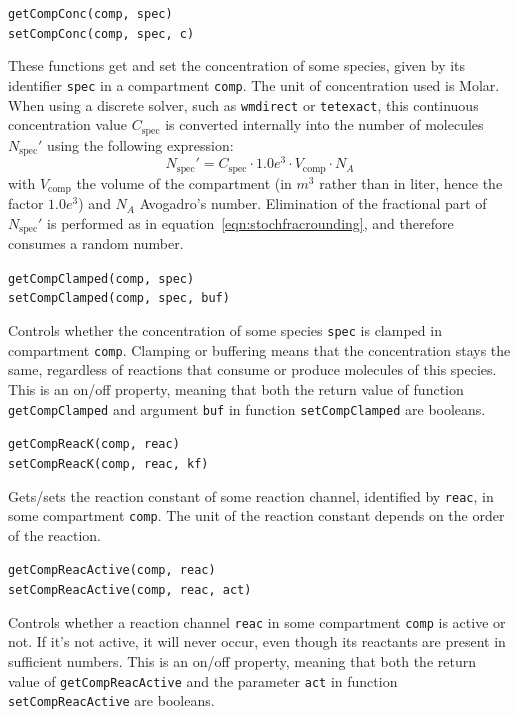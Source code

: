 \documentclass[a4paper,12pt]{book}
\begin{document}
{\texttt{getCompConc(comp, spec)}\\
\texttt{setCompConc(comp, spec, c)}

These functions get and set the concentration of some species, given by its identifier \texttt{spec} in a compartment \texttt{comp}. The unit of concentration used is Molar. When using a discrete solver, such as \texttt{wmdirect} or \texttt{tetexact}, this continuous concentration value $C_{\mathrm{spec}}$ is converted internally into the number of molecules $N_{\mathrm{spec}}'$ using the following expression:
\begin{equation}
N_{\mathrm{spec}}' = C_{\mathrm{spec}} \cdot 1.0e^3 \cdot V_{\mathrm{comp}} \cdot N_A
\end{equation}
with $V_{\mathrm{comp}}$ the volume of the compartment (in $m^3$ rather than in liter, hence the factor $1.0e^3$) and $N_A$ Avogadro's number. Elimination of the fractional part of $N_{\mathrm{spec}}'$ is performed as in equation~\ref{eqn:stochfracrounding}, and therefore consumes a random number.

\texttt{getCompClamped(comp, spec)}\\
\texttt{setCompClamped(comp, spec, buf)}

Controls whether the concentration of some species \texttt{spec} is clamped in compartment \texttt{comp}. Clamping or buffering means that the concentration stays the same, regardless of reactions that consume or produce molecules of this species. This is an on/off property, meaning that both the return value of function \texttt{getCompClamped} and argument \texttt{buf} in function \texttt{setCompClamped} are booleans.

\texttt{getCompReacK(comp, reac)}\\
\texttt{setCompReacK(comp, reac, kf)}

Gets/sets the reaction constant of some reaction channel, identified by \texttt{reac}, in some compartment \texttt{comp}. The unit of the reaction constant depends on the order of the reaction.

\texttt{getCompReacActive(comp, reac)} \\
\texttt{setCompReacActive(comp, reac, act)}

Controls whether a reaction channel \texttt{reac} in some compartment \texttt{comp} is active or not. If it's not active, it will never occur, even though its reactants are present in sufficient numbers. This is an on/off property, meaning that both the return value of \texttt{getCompReacActive} and the parameter \texttt{act} in function \texttt{setCompReacActive} are booleans.

}
\end{document}
